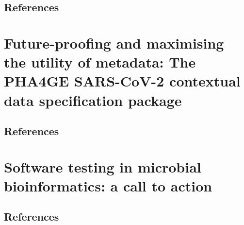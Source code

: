 \documentclass[12pt,a4paper,twoside,openright]{book}
\begin{document}
\begin{sloppy}
\thispagestyle{empty}
\clearpage \thispagestyle{empty}\mbox{}\clearpage
\newpage
\begin{refsection}

\newpage
\section{References}
\printbibliography[heading=none]
\end{refsection}

\newpage
\thispagestyle{empty}
\chapter{Future-proofing and maximising the utility of metadata: The PHA4GE SARS-CoV-2 contextual data specification package\label{ch:paper6}}

\thispagestyle{empty}
\clearpage \thispagestyle{empty}\mbox{}\clearpage
\newpage
\begin{refsection}

\newpage
\section{References}
\printbibliography[heading=none]
\end{refsection}

\newpage
\thispagestyle{empty}
\chapter{Software testing in microbial bioinformatics: a call to action\label{ch:paper7}}

\thispagestyle{empty}
\clearpage \thispagestyle{empty}\mbox{}\clearpage
\newpage
\begin{refsection}

\newpage
\section{References}
\printbibliography[heading=none]
\end{refsection}




\end{sloppy}
\end{document}
